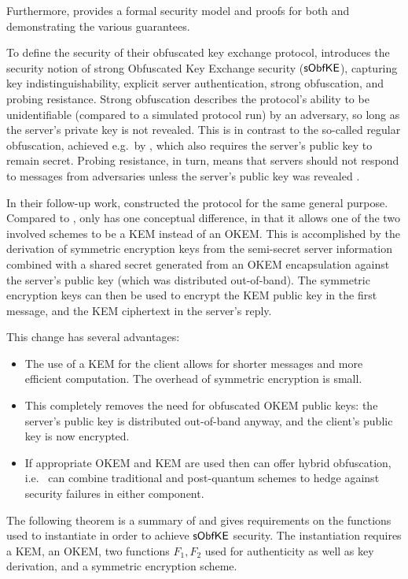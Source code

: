 Furthermore, \cite{CCS:GunSteVei24} provides a formal security model and proofs for both \obfsfour{} and \pqobfs{} demonstrating the various guarantees.

To define the security of their obfuscated key exchange protocol, \cite{CCS:GunSteVei24} introduces the security notion of strong Obfuscated Key Exchange security ($\mathsf{sObfKE}$), capturing key indistinguishability, explicit server authentication, strong obfuscation, and probing resistance.
Strong obfuscation describes the protocol's ability to be unidentifiable (compared to a simulated protocol run) by an adversary, so long as the server's private key is not revealed. This is in contrast to the so-called regular obfuscation, achieved e.g.~by \obfsfour{}, which also requires the server's public key to remain secret.
Probing resistance, in turn, means that servers should not respond to messages from adversaries unless the server's public key was revealed \cite[Section~4.1]{CCS:GunSteVei24}.

In their follow-up work, \cite{EPRINT:GRSV25} constructed the \drivel{} protocol for the same general purpose. Compared to \pqobfs{}, \drivel{} only has one conceptual difference, in that it allows one of the two involved schemes to be a KEM instead of an OKEM.
This is accomplished by the derivation of symmetric encryption keys from the semi-secret server information combined with a shared secret generated from an OKEM encapsulation against the server's public key (which was distributed out-of-band).
The symmetric encryption keys can then be used to encrypt the KEM public key in the first message, and the KEM ciphertext in the server's reply.

This change has several advantages:
\begin{itemize}
    \item The use of a KEM for the client allows for shorter messages and more efficient computation. The overhead of symmetric encryption is small.
    \item This completely removes the need for obfuscated OKEM public keys: the server's public key is distributed out-of-band anyway, and the client's public key is now encrypted.
    \item If appropriate OKEM and KEM are used then \drivel{} can offer hybrid obfuscation, i.e.~\drivel{} can combine traditional and post-quantum schemes to hedge against security failures in either component.
\end{itemize}

The following theorem is a summary of \cite[Theorem~5]{EPRINT:GRSV25} and gives requirements on the functions used to instantiate \drivel{} in order to achieve $\mathsf{sObfKE}$ security. The instantiation requires a KEM, an OKEM, two functions $F_1, F_2$ used for authenticity as well as key derivation, and a symmetric encryption scheme.

